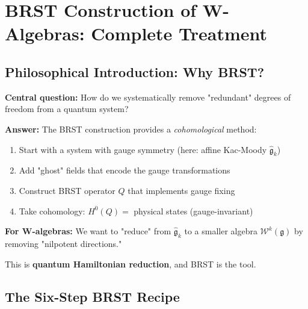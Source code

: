 \section{BRST Construction of W-Algebras: Complete Treatment}
\label{sec:brst-complete}

\subsection{Philosophical Introduction: Why BRST?}

\begin{motivation}
\label{mot:brst-philosophy}
\textbf{Central question:} How do we systematically remove "redundant" degrees of 
freedom from a quantum system?

\textbf{Answer:} The BRST construction provides a \emph{cohomological} method:
\begin{enumerate}
\item Start with a system with gauge symmetry (here: affine Kac-Moody $\widehat{\mathfrak{g}}_k$)
\item Add "ghost" fields that encode the gauge transformations
\item Construct BRST operator $Q$ that implements gauge fixing
\item Take cohomology: $H^0(Q) = $ physical states (gauge-invariant)
\end{enumerate}

\textbf{For W-algebras:} We want to "reduce" from $\widehat{\mathfrak{g}}_k$ to a 
smaller algebra $\mathcal{W}^k(\mathfrak{g})$ by removing "nilpotent directions."

This is \textbf{quantum Hamiltonian reduction}, and BRST is the tool.
\end{motivation}

\subsection{The Six-Step BRST Recipe}

\begin{center}
\end{center}


